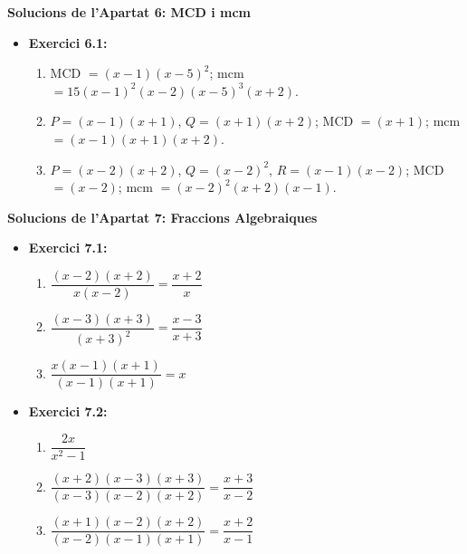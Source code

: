 \documentclass[12pt]{article}
\begin{document}
\begin{solucio}
\textbf{Solucions de l'Apartat 6: MCD i mcm}
\begin{itemize}
    \item \textbf{Exercici 6.1:}
    \begin{enumerate}[label=\alph*)]
        \item MCD $= (x-1)(x-5)^2$; mcm $= 15(x-1)^2(x-2)(x-5)^3(x+2)$.
        \item $P = (x-1)(x+1)$, $Q = (x+1)(x+2)$; MCD $= (x+1)$; mcm $= (x-1)(x+1)(x+2)$.
        \item $P = (x-2)(x+2)$, $Q = (x-2)^2$, $R = (x-1)(x-2)$; MCD $= (x-2)$; mcm $= (x-2)^2(x+2)(x-1)$.
    \end{enumerate}
\end{itemize}
\end{solucio}

\begin{solucio}
\textbf{Solucions de l'Apartat 7: Fraccions Algebraiques}
\begin{itemize}
    \item \textbf{Exercici 7.1:}
    \begin{enumerate}[label=\alph*)]
        \item $\dfrac{(x-2)(x+2)}{x(x-2)} = \dfrac{x+2}{x}$
        \item $\dfrac{(x-3)(x+3)}{(x+3)^2} = \dfrac{x-3}{x+3}$
        \item $\dfrac{x(x-1)(x+1)}{(x-1)(x+1)} = x$
    \end{enumerate}
    \item \textbf{Exercici 7.2:}
    \begin{enumerate}[label=\alph*)]
        \item $\dfrac{2x}{x^2-1}$
        \item $\dfrac{(x+2)(x-3)(x+3)}{(x-3)(x-2)(x+2)} = \dfrac{x+3}{x-2}$
        \item $\dfrac{(x+1)(x-2)(x+2)}{(x-2)(x-1)(x+1)} = \dfrac{x+2}{x-1}$
    \end{enumerate}
\end{itemize}
\end{solucio}
\end{document}
